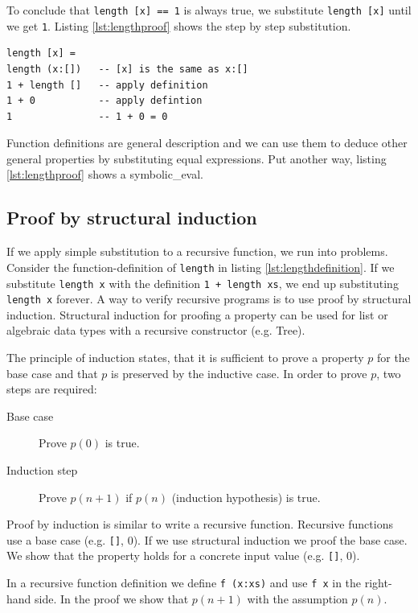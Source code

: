 To conclude that \verb|length [x] == 1| is always true, we substitute \verb|length [x]| until we get \verb|1|. Listing \ref{lst:lengthproof} shows the step by step substitution.
\begin{lstlisting}[caption={Deduce that the length of a list with one element is 1},label={lst:lengthproof}]
length [x] = 
length (x:[])   -- [x] is the same as x:[]
1 + length []   -- apply definition
1 + 0           -- apply defintion
1               -- 1 + 0 = 0
\end{lstlisting}
Function definitions are general description and we can use them to deduce other general properties by substituting equal expressions. Put another way, listing \ref{lst:lengthproof} shows a \gls{symbolic_eval}.

\subsection{Proof by structural induction}
\label{sec:induction}

If we apply simple substitution to a recursive function, we run into problems.
Consider the \gls{function-definition} of \verb|length| in listing \ref{lst:lengthdefinition}.
If we substitute \verb|length x| with the definition \verb|1 + length xs|, we end up substituting \verb|length x| forever. A way to verify recursive programs is to use proof by structural induction.  
Structural induction for proofing a property can be used for list or algebraic data types with a recursive constructor (e.g. Tree).

 The principle of induction states, that it is sufficient to prove a property $p$ for the base case and that $p$ is preserved by the inductive case. In order to prove $p$, two steps are required:
 \begin{description}
 \item[Base case] Prove $p(0)$ is true.
 \item[Induction step] Prove $p(n+1)$ if $p(n)$ (induction hypothesis) is true.
 \end{description}

Proof by induction is similar to write a recursive function. Recursive functions use a base case (e.g. \verb|[]|, 0). 
If we use structural induction we proof the base case. We show that the property holds for a concrete input value (e.g. \verb|[]|, 0). 

In a recursive function definition we define \verb|f (x:xs)| and use \verb|f x| in the right-hand side. In the proof we show that $p(n+1)$ with the assumption $p(n)$.

